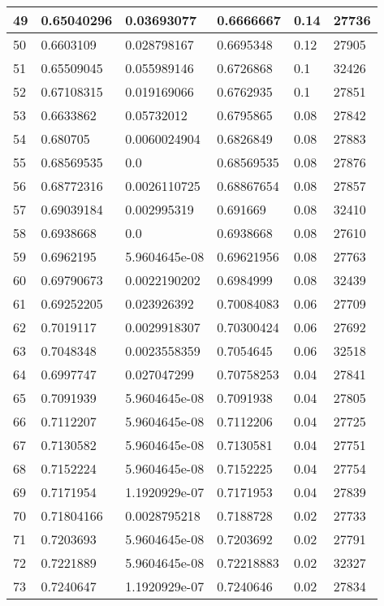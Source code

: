 \begin{longtable}{|l|l|l|l|l|l|}
49 & 0.65040296 & 0.03693077 & 0.6666667 & 0.14 & 27736 \\ \hline 
50 & 0.6603109 & 0.028798167 & 0.6695348 & 0.12 & 27905 \\ \hline 
51 & 0.65509045 & 0.055989146 & 0.6726868 & 0.1 & 32426 \\ \hline 
52 & 0.67108315 & 0.019169066 & 0.6762935 & 0.1 & 27851 \\ \hline 
53 & 0.6633862 & 0.05732012 & 0.6795865 & 0.08 & 27842 \\ \hline 
54 & 0.680705 & 0.0060024904 & 0.6826849 & 0.08 & 27883 \\ \hline 
55 & 0.68569535 & 0.0 & 0.68569535 & 0.08 & 27876 \\ \hline 
56 & 0.68772316 & 0.0026110725 & 0.68867654 & 0.08 & 27857 \\ \hline 
57 & 0.69039184 & 0.002995319 & 0.691669 & 0.08 & 32410 \\ \hline 
58 & 0.6938668 & 0.0 & 0.6938668 & 0.08 & 27610 \\ \hline 
59 & 0.6962195 & 5.9604645e-08 & 0.69621956 & 0.08 & 27763 \\ \hline 
60 & 0.69790673 & 0.0022190202 & 0.6984999 & 0.08 & 32439 \\ \hline 
61 & 0.69252205 & 0.023926392 & 0.70084083 & 0.06 & 27709 \\ \hline 
62 & 0.7019117 & 0.0029918307 & 0.70300424 & 0.06 & 27692 \\ \hline 
63 & 0.7048348 & 0.0023558359 & 0.7054645 & 0.06 & 32518 \\ \hline 
64 & 0.6997747 & 0.027047299 & 0.70758253 & 0.04 & 27841 \\ \hline 
65 & 0.7091939 & 5.9604645e-08 & 0.7091938 & 0.04 & 27805 \\ \hline 
66 & 0.7112207 & 5.9604645e-08 & 0.7112206 & 0.04 & 27725 \\ \hline 
67 & 0.7130582 & 5.9604645e-08 & 0.7130581 & 0.04 & 27751 \\ \hline 
68 & 0.7152224 & 5.9604645e-08 & 0.7152225 & 0.04 & 27754 \\ \hline 
69 & 0.7171954 & 1.1920929e-07 & 0.7171953 & 0.04 & 27839 \\ \hline 
70 & 0.71804166 & 0.0028795218 & 0.7188728 & 0.02 & 27733 \\ \hline 
71 & 0.7203693 & 5.9604645e-08 & 0.7203692 & 0.02 & 27791 \\ \hline 
72 & 0.7221889 & 5.9604645e-08 & 0.72218883 & 0.02 & 32327 \\ \hline 
73 & 0.7240647 & 1.1920929e-07 & 0.7240646 & 0.02 & 27834 \\ \hline 

\end{longtable}
